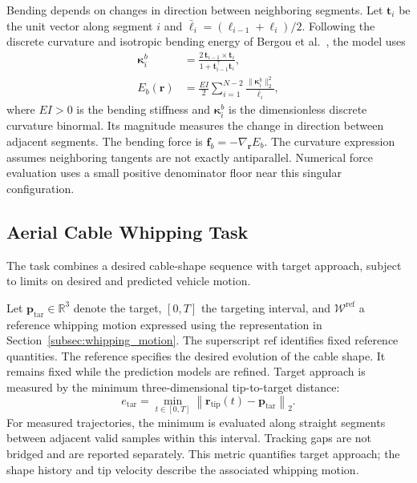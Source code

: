 \documentclass[letterpaper, 10 pt, conference]{ieeeconf}
\begin{document}
Bending depends on changes in direction between neighboring
segments. Let $\mathbf{t}_i$ be the unit vector along segment
$i$ and $\bar{\ell}_i=(\ell_{i-1}+\ell_i)/2$.
Following the discrete curvature and isotropic bending energy
of Bergou et al.~\cite{bergou2008discrete}, the model uses
\begin{equation}
\begin{aligned}
\boldsymbol{\kappa}_i^b
&=
\frac{2\,\mathbf{t}_{i-1}\times\mathbf{t}_i}
{1+\mathbf{t}_{i-1}^{\top}\mathbf{t}_i},\\
E_b(\mathbf{r})
&=
\frac{EI}{2}
\sum_{i=1}^{N-2}
\frac{\|\boldsymbol{\kappa}_i^b\|_2^2}{\bar{\ell}_i},
\end{aligned}
\label{eq:bending_energy}
\end{equation}
where $EI>0$ is the bending stiffness and
$\boldsymbol{\kappa}_i^b$ is the dimensionless discrete curvature binormal.
Its magnitude measures the change in direction between adjacent
segments. The bending force is
$\mathbf{f}_b=-\nabla_{\mathbf{r}}E_b$.
The curvature expression assumes neighboring tangents are not
exactly antiparallel. Numerical force evaluation uses a small
positive denominator floor near this singular configuration.

\subsection*{Aerial Cable Whipping Task}
The task combines a desired cable-shape sequence with target
approach, subject to limits on desired and predicted vehicle motion.

Let $\mathbf{p}_{\mathrm{tar}}\in\mathbb{R}^{3}$ denote the target,
$[0,T]$ the targeting interval, and $\mathcal{W}^{\mathrm{ref}}$ a
reference whipping motion expressed using the representation
in Section~\ref{subsec:whipping_motion}.
The superscript $\mathrm{ref}$ identifies fixed reference quantities.
The reference specifies the desired evolution of the cable shape.
It remains fixed while the prediction models are refined.
Target approach is measured by the minimum
three-dimensional tip-to-target distance:
\begin{equation}
e_{\mathrm{tar}}
=
\min_{t\in[0,T]}
\left\|
\mathbf{r}_{\mathrm{tip}}(t)
-\mathbf{p}_{\mathrm{tar}}
\right\|_2.
\label{eq:target_distance}
\end{equation}
For measured trajectories, the minimum is evaluated along
straight segments between adjacent valid samples within this
interval. Tracking gaps are not bridged and are reported
separately. This metric quantifies target approach; the shape
history and tip velocity describe the associated whipping motion.
\end{document}
